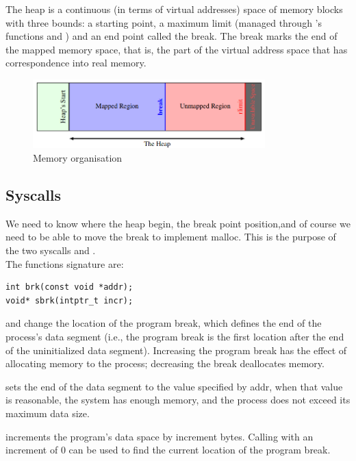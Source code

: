 The heap is a continuous (in terms of virtual addresses) space of memory blocks with three bounds: a starting point, a maximum limit (managed through ’s functions  and ) and an end point called the break. The break marks the end of the mapped memory space, that is, the part of the virtual address space that has correspondence into real memory.\\

\begin{figure}[H]
    \begin{center}
        \includegraphics[width=0.8\textwidth]{figures/heap}
    \caption{Memory organisation}
    \label{default}
    \end{center}
\end{figure}

\subsection{Syscalls}
We need to know where the heap begin, the break point position,and of course we need to be able to move the break to implement malloc. This is the purpose of the two syscalls  and .\\

The functions signature are:
\begin{lstlisting}[style=cstyle]
int brk(const void *addr);
void* sbrk(intptr_t incr);
\end{lstlisting}

 and  change the location of the program break, which defines the end of the process's data segment (i.e., the program break is the first location after the end of the uninitialized data segment). Increasing the program break has the effect of allocating memory to the process; decreasing the break deallocates memory.

 sets the end of the data segment to the value specified by addr, when that value is reasonable, the system has enough memory, and the process does not exceed its maximum data size.

 increments the program's data space by increment bytes. Calling  with an increment of 0 can be used to find the current location of the program break.


